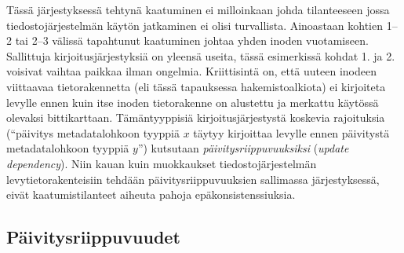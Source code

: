 Tässä järjestyksessä tehtynä kaatuminen ei milloinkaan johda tilanteeseen jossa tiedostojärjestelmän käytön jatkaminen ei olisi turvallista.
Ainoastaan kohtien 1--2 tai 2--3 välissä tapahtunut kaatuminen johtaa yhden inoden vuotamiseen.
Sallittuja kirjoitusjärjestyksiä on yleensä useita, tässä esimerkissä kohdat 1. ja 2. voisivat vaihtaa paikkaa ilman ongelmia.
Kriittisintä on, että uuteen inodeen viittaavaa tietorakennetta (eli tässä tapauksessa hakemistoalkiota) ei kirjoiteta levylle ennen kuin itse inoden tietorakenne on alustettu ja merkattu käytössä olevaksi bittikarttaan.
Tämäntyyppisiä kirjoitusjärjestystä koskevia rajoituksia (``päivitys metadatalohkoon tyyppiä $x$ täytyy kirjoittaa levylle ennen päivitystä metadatalohkoon tyyppiä $y$'') kutsutaan \emph{päivitysriippuvuuksiksi} (\emph{update dependency}).
Niin kauan kuin muokkaukset tiedostojärjestelmän levytietorakenteisiin tehdään päivitysriippuvuuksien sallimassa järjestyksessä,
eivät kaatumistilanteet aiheuta pahoja epäkonsistenssiuksia.

\subsection{Päivitysriippuvuudet}



